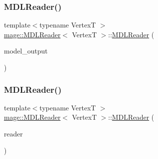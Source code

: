 \subsubsection{\texorpdfstring{M\+D\+L\+Reader()}{MDLReader()}\hspace{0.1cm}{\footnotesize\ttfamily [1/3]}}
{\footnotesize\ttfamily template$<$typename VertexT $>$ \\
\hyperlink{classmage_1_1_m_d_l_reader}{mage\+::\+M\+D\+L\+Reader}$<$ VertexT $>$\+::\hyperlink{classmage_1_1_m_d_l_reader}{M\+D\+L\+Reader} (\begin{DoxyParamCaption}\item[{\hyperlink{structmage_1_1_model_output}{Model\+Output}$<$ VertexT $>$ \&}]{model\+\_\+output }\end{DoxyParamCaption})\hspace{0.3cm}{\ttfamily [explicit]}}

\hypertarget{classmage_1_1_m_d_l_reader_ae7b3ee7b2b02101da041249e98f31bcc}{}\label{classmage_1_1_m_d_l_reader_ae7b3ee7b2b02101da041249e98f31bcc} 
\subsubsection{\texorpdfstring{M\+D\+L\+Reader()}{MDLReader()}\hspace{0.1cm}{\footnotesize\ttfamily [2/3]}}
{\footnotesize\ttfamily template$<$typename VertexT $>$ \\
\hyperlink{classmage_1_1_m_d_l_reader}{mage\+::\+M\+D\+L\+Reader}$<$ VertexT $>$\+::\hyperlink{classmage_1_1_m_d_l_reader}{M\+D\+L\+Reader} (\begin{DoxyParamCaption}\item[{const \hyperlink{classmage_1_1_m_d_l_reader}{M\+D\+L\+Reader}$<$ VertexT $>$ \&}]{reader }\end{DoxyParamCaption})\hspace{0.3cm}{\ttfamily [delete]}}

\hypertarget{classmage_1_1_m_d_l_reader_ac2e45fb05db0255d7ebf2da6e54db3f4}{}\label{classmage_1_1_m_d_l_reader_ac2e45fb05db0255d7ebf2da6e54db3f4} 
